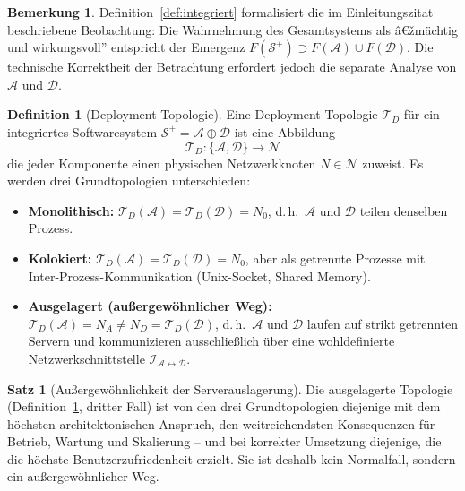 ﻿\documentclass[a4paper,12pt]{article}
\theoremstyle{definition}
\newtheorem{definition}{Definition}
\newtheorem{satz}{Satz}
\newtheorem{bemerkung}{Bemerkung}
\begin{document}
\begin{bemerkung}
Definition~\ref{def:integriert} formalisiert die im Einleitungszitat beschriebene Beobachtung: Die Wahrnehmung des Gesamtsystems als â€žmächtig und wirkungsvoll'' entspricht der Emergenz $F(\mathcal{S}^+) \supset F(\mathcal{A}) \cup F(\mathcal{D})$. Die technische Korrektheit der Betrachtung erfordert jedoch die separate Analyse von $\mathcal{A}$ und $\mathcal{D}$.
\end{bemerkung}

\begin{definition}[Deployment-Topologie]
\label{def:topologie}
Eine Deployment-Topologie $\mathcal{T}_D$ für ein integriertes Softwaresystem $\mathcal{S}^+ = \mathcal{A} \oplus \mathcal{D}$ ist eine Abbildung
\[
\mathcal{T}_D: \{\mathcal{A}, \mathcal{D}\} \to \mathcal{N}
\]
die jeder Komponente einen physischen Netzwerkknoten $N \in \mathcal{N}$ zuweist. Es werden drei Grundtopologien unterschieden:
\begin{itemize}
  \item \textbf{Monolithisch:} $\mathcal{T}_D(\mathcal{A}) = \mathcal{T}_D(\mathcal{D}) = N_0$, d.\,h.\ $\mathcal{A}$ und $\mathcal{D}$ teilen denselben Prozess.
  \item \textbf{Kolokiert:} $\mathcal{T}_D(\mathcal{A}) = \mathcal{T}_D(\mathcal{D}) = N_0$, aber als getrennte Prozesse mit Inter-Prozess-Kommunikation (Unix-Socket, Shared Memory).
  \item \textbf{Ausgelagert (außergewöhnlicher Weg):} $\mathcal{T}_D(\mathcal{A}) = N_A \neq N_D = \mathcal{T}_D(\mathcal{D})$, d.\,h.\ $\mathcal{A}$ und $\mathcal{D}$ laufen auf strikt getrennten Servern und kommunizieren ausschließlich über eine wohldefinierte Netzwerkschnittstelle $\mathcal{I}_{\mathcal{A} \leftrightarrow \mathcal{D}}$.
\end{itemize}
\end{definition}

\begin{satz}[Außergewöhnlichkeit der Serverauslagerung]
\label{satz:auslagerung}
Die ausgelagerte Topologie (Definition~\ref{def:topologie}, dritter Fall) ist von den drei Grundtopologien diejenige mit dem höchsten architektonischen Anspruch, den weitreichendsten Konsequenzen für Betrieb, Wartung und Skalierung -- und bei korrekter Umsetzung diejenige, die die höchste Benutzerzufriedenheit erzielt. Sie ist deshalb kein Normalfall, sondern ein außergewöhnlicher Weg.
\end{satz}
\end{document}
